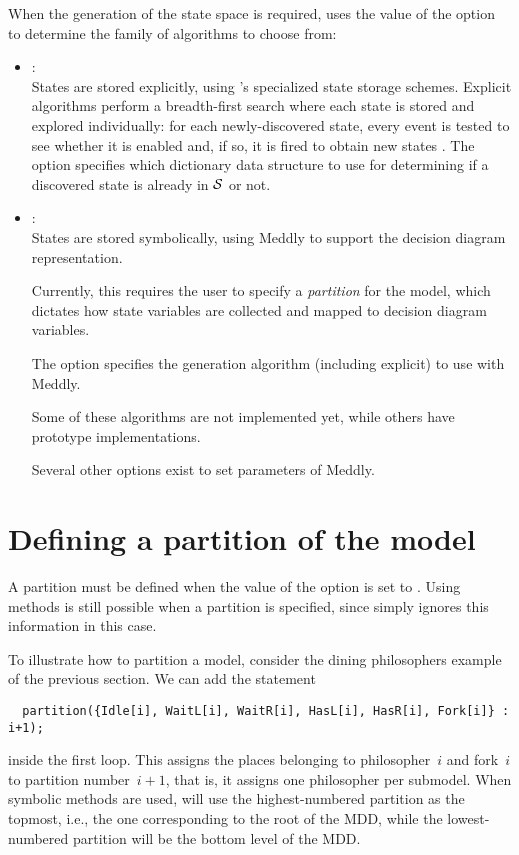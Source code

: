 When the generation of the state space is required,
{\smart} uses the value of the  option
to determine the family of algorithms to choose from:
\begin{itemize}
  \item {}:\\
  States are stored explicitly, using {\smart}'s specialized state storage
  schemes.
  Explicit algorithms perform a breadth-first search where
  each state is stored and explored individually: for each
  newly-discovered state, every event is tested to see whether it is enabled
  and, if so, it is fired to obtain new states
  \cite{1997Tools-Storage}.
  The option  specifies which dictionary 
  data structure to use for determining if a discovered state
  is already in $\mathcal{S}$ or not.

  \item {}:\\
  States are stored symbolically, using Meddly to support
  the decision diagram representation.
  \begin{release}
  Currently,
  this requires the user to specify a \emph{partition} for the model,
  which dictates how state variables are collected and mapped
  to decision diagram variables.
  \end{release}
  The option  specifies
  the generation algorithm (including explicit)
  to use with Meddly.
  \begin{release}
  Some of these algorithms are not implemented yet,
  while others have prototype implementations.
  \end{release}
  Several other options exist to set parameters of Meddly.
\end{itemize}


\section{Defining a partition of the model} \label{SEC:partition}


A partition must be defined when the value of the  option
is set to .
Using  methods is still possible when a partition is
specified, since {\smart} simply ignores this information in this case.

To illustrate how to partition a model, consider the dining philosophers
example of the previous section.
We can add the statement 
\begin{lstlisting}
  partition({Idle[i], WaitL[i], WaitR[i], HasL[i], HasR[i], Fork[i]} : i+1);
\end{lstlisting}
inside the first  loop.
This assigns the places belonging to philosopher~$i$ and fork~$i$ to
partition number~$i+1$, that is, it assigns one philosopher per submodel.
When symbolic methods are used,
{\smart} will use the highest-numbered partition as the topmost,
i.e., the one corresponding to the root of the MDD, 
while the lowest-numbered partition will be the bottom level of the MDD.

